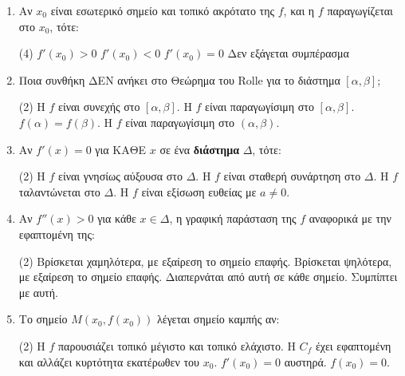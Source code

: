 \documentclass[11pt,a4paper]{article}
\renewcommand{\textdexiakeraia}{}
\begin{document}
\begin{enumerate}[label=\textbf{\arabic*.}, itemsep=4mm]
    \item Αν $x_0$ είναι εσωτερικό σημείο και τοπικό ακρότατο της $f$, και η $f$ παραγωγίζεται στο $x_0$, τότε:
    \begin{tasks}[label=\let\textdexiakeraia\relax\alph*.](4)
        \task $f'(x_0) > 0$
        \task $f'(x_0) < 0$
        \task $f'(x_0) = 0$
        \task Δεν εξάγεται συμπέρασμα
    \end{tasks}

    \item Ποια συνθήκη ΔΕΝ ανήκει στο Θεώρημα του Rolle για το διάστημα $[\alpha, \beta]$;
    \begin{tasks}[label=\let\textdexiakeraia\relax\alph*.](2)
        \task H $f$ είναι συνεχής στο $[\alpha, \beta]$.
        \task H $f$ είναι παραγωγίσιμη στο $[\alpha, \beta]$.
        \task $f(\alpha) = f(\beta)$.
        \task H $f$ είναι παραγωγίσιμη στο $(\alpha, \beta)$.
    \end{tasks}

    \item Αν $f'(x) = 0$ για ΚΑΘΕ $x$ σε ένα \textbf{διάστημα} $\Delta$, τότε:
    \begin{tasks}[label=\let\textdexiakeraia\relax\alph*.](2)
        \task H $f$ είναι γνησίως αύξουσα στο $\Delta$.
        \task H $f$ είναι σταθερή συνάρτηση στο $\Delta$.
        \task H $f$ ταλαντώνεται στο $\Delta$.
        \task H $f$ είναι εξίσωση ευθείας με $a \ne 0$.
    \end{tasks}

    \item Αν $f''(x) > 0$ για κάθε $x \in \Delta$, η γραφική παράσταση της $f$ αναφορικά με την εφαπτομένη της:
    \begin{tasks}[label=\let\textdexiakeraia\relax\alph*.](2)
        \task Βρίσκεται χαμηλότερα, με εξαίρεση το σημείο επαφής.
        \task Βρίσκεται ψηλότερα, με εξαίρεση το σημείο επαφής.
        \task Διαπερνάται από αυτή σε κάθε σημείο.
        \task Συμπίπτει με αυτή.
    \end{tasks}

    \item Το σημείο $M(x_0, f(x_0))$ λέγεται σημείο καμπής αν:
    \begin{tasks}[label=\let\textdexiakeraia\relax\alph*.](2)
        \task H $f$ παρουσιάζει τοπικό μέγιστο και τοπικό ελάχιστο.
        \task H $C_f$ έχει εφαπτομένη και αλλάζει κυρτότητα εκατέρωθεν του $x_0$.
        \task $f'(x_0) = 0$ αυστηρά.
        \task $f(x_0) = 0$.
    \end{tasks}


\end{enumerate}
\end{document}

